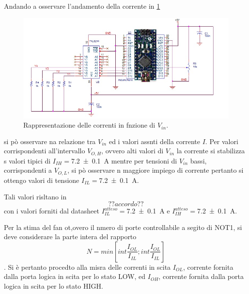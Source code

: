 	Andando a osservare l'andamento della corrente in \figurename{ \ref{f:corr} }
		\begin{center}
		\begin{figure}[h]
			\includegraphics[scale=0.50]{imp.png}
			\caption{Rappresentazione delle correnti in fnzione di $V_{in}$. }
			\label{f:corr}
		\end{figure}
	\end{center}
	si pò osservare na relazione tra $V_{in}$ ed i valori assnti della corrente $I$.
	Per valori corrispondenti all'intervallo $V_{O,H}$, ovvero alti valori di 	$V_{in}$
	la corrente si stabilizza s valori tipici di $I_{IH}=$\SI{7.2 \pm 0.1}{\ampere}
	mentre per tensioni di $V_{in}$ bassi, corrispondenti a $V_{O,L}$, si pò
	osservare n maggiore impiego di corrente pertanto si ottengo valori di tensione $I_{IL}=$\SI{7.2 \pm 0.1}{\ampere}.
	
	Tali valori risltano in $$??accordo??$$ con i valori forniti dal datasheet 
	$I_{IL}^{atteso}=$\SI{7.2 \pm 0.1}{\ampere} e $I_{IH}^{atteso}=$\SI{7.2 \pm 0.1}{\ampere}.
	
	Per la stima del fan ot,overo il nmero di porte controllabile a segito di NOT1, si deve considerare la parte intera del rapporto \begin{equation}
	N=min[int \frac{I_{OL}}{I_{IL}};int \frac{I_{OL}}{I_{IL}}]
		\end{equation}\label{eq:fan-o}
		.
	Si è pertanto procedto alla misra delle correnti in scita $I_{OL}$, corrente fornita dalla porta logica in scita per lo stato LOW, ed $I_{OH}$, corrente fornita dalla porta logica in scita per lo stato HIGH.
	
